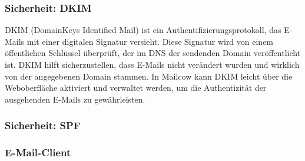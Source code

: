 \subsubsection{Sicherheit: DKIM}
DKIM (DomainKeys Identified Mail) ist ein Authentifizierungsprotokoll, das E-Mails mit einer digitalen 
Signatur versieht. Diese Signatur wird von einem öffentlichen Schlüssel überprüft, der im DNS der sendenden
Domain veröffentlicht ist. DKIM hilft sicherzustellen, dass E-Mails nicht verändert wurden und wirklich von
der angegebenen Domain stammen. In Mailcow kann DKIM leicht über die Weboberfläche aktiviert und verwaltet
werden, um die Authentizität der ausgehenden E-Mails zu gewährleisten.

\subsubsection{Sicherheit: SPF}

\subsubsection{E-Mail-Client}

